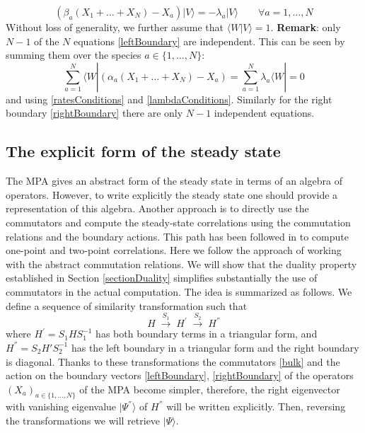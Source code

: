 \documentclass[11pt]{article}
\numberwithin{equation}{section}
\numberwithin{equation}{subsection}
\begin{document}
\begin{equation}\label{rightBoundary}
	\left(\beta_{a}(X_{1}+\ldots+X_{N})-X_{a}\right)|V\rangle=-\lambda_{a}|V\rangle\qquad\forall a=1,\ldots,N
\end{equation}
Without loss of generality, we further assume that $\langle W|V\rangle=1$. 
\newline \newline
\textbf{Remark}: only $N-1$ of the $N$ equations \eqref{leftBoundary}  are independent. This can be seen by summing them over the species $a\in \{1,\ldots,N\}$:
	\begin{equation}
		\sum_{a=1}^{N}	\langle W|\left(\alpha_{a}(X_{1}+\ldots+X_{N})-X_{a}\right)=\sum_{a=1}^{N}\lambda_{a}\langle W|=0
	\end{equation}
	and using  \eqref{ratesConditions} and \eqref{lambdaConditions}.
 Similarly for the right boundary  \eqref{rightBoundary} there are only  $N-1$ independent equations.
\subsection{The explicit form of the steady state}\label{subsection-exact}
The MPA gives an abstract form of the steady state in terms of an algebra of operators. However, to write explicitly the steady state one should provide a representation of this algebra. Another approach is to directly use the commutators and compute the steady-state correlations using the commutation relations and the boundary actions. This path has been followed in \cite{vanicat2017exact} to compute one-point and two-point correlations. 
Here we follow the approach of working with the abstract commutation  relations. We will show that the duality property established in Section \ref{sectionDuality} simplifies substantially the  use of commutators in the actual
computation. The idea is summarized as follows. We define a sequence of similarity transformation such that 
\begin{equation}
	H\;\xrightarrow{S_{1}}\;H^{'}\;\xrightarrow{S_{2}}\;H^{''}
\end{equation} 
where $H^{'}= S_{1} H S_{1}^{-1} $ has both boundary terms in a triangular form, and $H^{''} = S_{2}H' S_{2}^{-1}$ has the left boundary in a triangular form and the right boundary is diagonal. Thanks to these transformations the commutators \eqref{bulk} and the action on the boundary vectors \eqref{leftBoundary}, \eqref{rightBoundary} of the operators $(X_{a})_{a\in\{1,\ldots,N\}}$ of the MPA become simpler, therefore, the right eigenvector with vanishing eigenvalue $|\Psi^{''}\rangle$ of $H^{''}$ will be written explicitly. Then, reversing the transformations we will retrieve $|\Psi\rangle$.
\end{document}
